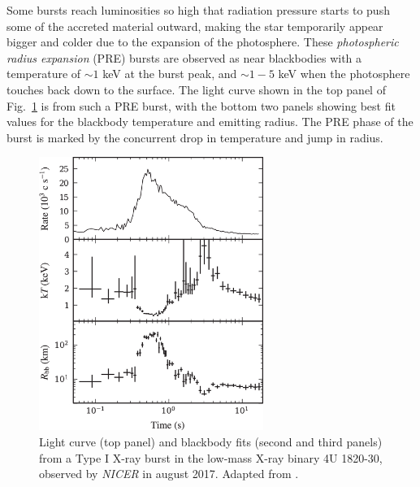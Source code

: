 \documentclass[../main.tex]{subfiles}
\begin{document}
Some bursts reach luminosities so high that radiation pressure starts to push some of the accreted material outward, making the star temporarily appear bigger and colder due to the expansion of the photosphere.  These \textit{photospheric radius expansion} (PRE) bursts are observed as near blackbodies with a temperature of ${\sim}1$ keV at the burst peak, and ${\sim}1-5$ keV when the photosphere touches back down to the surface. The light curve shown in the top panel of Fig.~\ref{fig:keek2018_fig3} is from such a PRE burst, with the bottom two panels showing best fit values for the blackbody temperature and emitting radius. The PRE phase of the burst is marked by the concurrent drop in temperature and jump in radius.  

\begin{figure}[htb!]
    \centering
    \includegraphics[width=0.65\textwidth]{figures/Keek2018_fig3_mod.png}
    \caption[Type I X-ray burst light curve]{Light curve (top panel) and blackbody fits (second and third panels) from a Type I X-ray burst in the low-mass X-ray binary 4U 1820-30, observed by \textit{NICER} in august 2017. Adapted from \citet{Keek2018a}.}
    \label{fig:keek2018_fig3}
\end{figure}

\end{document}
